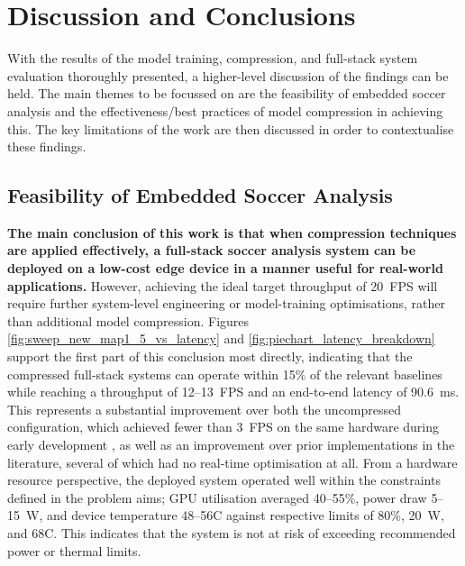 \section{Discussion and Conclusions}
\label{sec:discussion}

With the results of the model training, compression, and full-stack system evaluation thoroughly presented, a higher-level discussion of the findings can be held. The main themes to be focussed on are the feasibility of embedded soccer analysis and the effectiveness/best practices of model compression in achieving this. The key limitations of the work are then discussed in order to contextualise these findings.


\subsection{Feasibility of Embedded Soccer Analysis}

\textbf{The main conclusion of this work is that when compression techniques are applied effectively, a full-stack soccer analysis system can be deployed on a low-cost edge device in a manner useful for real-world applications.} However, achieving the ideal target throughput of 20~FPS will require further system-level engineering or model-training optimisations, rather than additional model compression. Figures \ref{fig:sweep_new_map1_5_vs_latency} and \ref{fig:piechart_latency_breakdown} support the first part of this conclusion most directly, indicating that the compressed full-stack systems can operate within 15\% of the relevant baselines while reaching a throughput of 12--13~FPS and an end-to-end latency of 90.6~ms. This represents a substantial improvement over both the uncompressed configuration, which achieved fewer than 3~FPS on the same hardware during early development \cite{my_conference_paper}, as well as an improvement over prior implementations in the literature, several of which had no real-time optimisation at all. From a hardware resource perspective, the deployed system operated well within the constraints defined in the problem aims; GPU utilisation averaged 40--55\%, power draw 5--15~W, and device temperature 48--56\textdegree C against respective limits of 80\%, 20~W, and 68\textdegree C. This indicates that the system is not at risk of exceeding recommended power or thermal limits.

